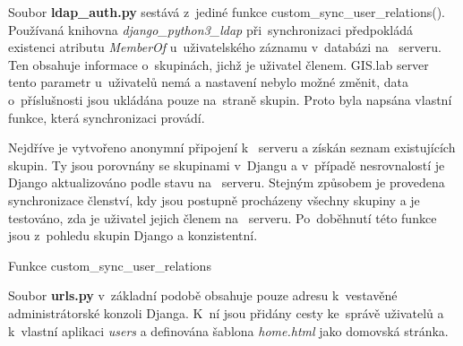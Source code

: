 Soubor \textbf{ldap\_auth.py} sestává z~jediné funkce
\textsf{custom\_sync\_user\_relations()}. Používaná knihovna
\textit{django\_python3\_ldap} při~synchronizaci předpokládá existenci
atributu \textit{MemberOf} u~uživatelského záznamu v~databázi 
na~ serveru. Ten obsahuje informace o~skupinách, jichž je
uživatel členem. GIS.lab server tento parametr u~uživatelů nemá a
nastavení nebylo možné změnit, data o~příslušnosti jsou ukládána pouze
na~straně skupin. Proto byla napsána vlastní funkce, která
synchronizaci provádí.

Nejdříve je vytvořeno anonymní připojení k~ serveru a získán
seznam \linebreak existujících skupin. Ty jsou porovnány se skupinami v~Djangu a
v~případě nesrovnalostí je Django aktualizováno podle stavu 
na~ serveru. Stejným způsobem je provedena synchronizace
členství, kdy jsou postupně procházeny všechny skupiny a je testováno,
zda je uživatel jejich členem na~ serveru. Po~doběhnutí této
funkce jsou z~pohledu skupin Django a  konzistentní.

\begin{algorithm}
\caption{Funkce custom\_sync\_user\_relations}
\label{alg:custom-sync-user-relations}
	\begin{algorithmic} [1]
    	\ENDIF
    \ENDFOR
	\end{algorithmic}
\end{algorithm}

\begin{algorithm}
\begin{algorithmic} [1] 
    	\ELSE
    	\ENDIF
    	\ENDIF
	\ENDFOR
    \end{algorithmic}
\end{algorithm}

Soubor \textbf{urls.py} v~základní podobě obsahuje pouze 
adresu k~vestavěné administrátorské konzoli Djanga. K~ní jsou přidány
cesty ke~správě uživatelů a k~vlastní aplikaci \textit{users} a
definována šablona \textit{home.html} jako domovská stránka.


